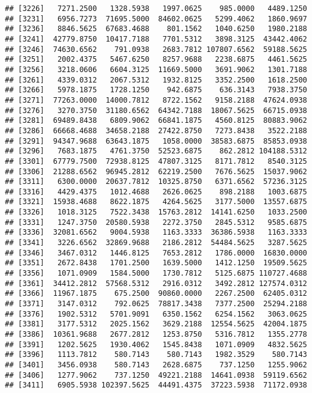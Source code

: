 \documentclass[]{article}
\begin{document}
\begin{verbatim}
## [3226]   7271.2500   1328.5938   1997.0625    985.0000   4489.1250
## [3231]   6956.7273  71695.5000  84602.0625   5299.4062   1860.9697
## [3236]   8846.5625  67683.4688    801.1562   1040.6250   1980.2188
## [3241]  42779.8750  10417.7188   7701.5312   3898.3125  43442.4062
## [3246]  74630.6562    791.0938   2683.7812 107807.6562  59188.5625
## [3251]   2002.4375   5467.6250   8257.9688   2238.6875   4461.5625
## [3256]   3218.0606   6604.3125  11669.5000   3691.9062   1301.7188
## [3261]   4339.0312   2067.5312   1932.8125   3352.2500   1618.2500
## [3266]   5978.1875   1728.1250    942.6875    636.3143   7938.3750
## [3271]  77263.0000  14000.7812   8722.1562   9158.2188  47624.0938
## [3276]   3270.3750  31180.6562  64342.7188  18067.5625  66715.0938
## [3281]  69489.8438   6809.9062  66841.1875   4560.8125  80883.9062
## [3286]  66668.4688  34658.2188  27422.8750   7273.8438   3522.2188
## [3291]  94347.9688  63643.1875   1058.0000  38583.6875  85853.0938
## [3296]   7683.1875   4761.3750  52523.6875    862.2812 104188.5312
## [3301]  67779.7500  72938.8125  47807.3125   8171.7812   8540.3125
## [3306]  21288.6562  96945.2812  62219.2500   7676.5625  15037.9062
## [3311]   6300.0000  20637.7812  10325.8750   6371.6562  57236.3125
## [3316]   4429.4375   1012.4688   2626.0625    898.2188   1003.6875
## [3321]  15938.4688   8622.1875   4264.5625   3177.5000  13557.6875
## [3326]   1018.3125   7522.3438  15763.2812  14141.6250   1033.2500
## [3331]   1247.3750  20580.5938   2272.3750   2845.5312   9585.6875
## [3336]  32081.6562   9004.5938   1163.3333  36386.5938   1163.3333
## [3341]   3226.6562  32869.9688   2186.2812  54484.5625   3287.5625
## [3346]   3467.0312   1446.8125   7653.2812   1786.0000  16830.0000
## [3351]   2672.8438   1701.2500   1639.5000   1412.1250  19509.5625
## [3356]   1071.0909   1584.5000   1730.7812   5125.6875 110727.4688
## [3361]  34412.2812  57568.5312   2916.0312   3492.2812 127574.0312
## [3366]  11967.1875    675.2500  90860.0000   2267.2500  62405.0312
## [3371]   3147.0312    792.0625  78817.3438   7377.2500  25294.2188
## [3376]   1902.5312   5701.9091   6350.1562   6254.1562   3063.0625
## [3381]   3177.5312   2025.1562   3629.2188  12554.5625  42004.1875
## [3386]  10361.9688   2677.2812   1253.8750   5316.7812   1355.2778
## [3391]   1202.5625   1930.4062   1545.8438   1071.0909   4832.5625
## [3396]   1113.7812    580.7143    580.7143   1982.3529    580.7143
## [3401]   3456.0938    580.7143   2628.6875    737.1250   1255.9062
## [3406]   1277.9062    737.1250  49221.2188  14641.0938  59119.6562
## [3411]   6905.5938 102397.5625  44491.4375  37223.5938  71172.0938

\end{verbatim}
\end{document}
